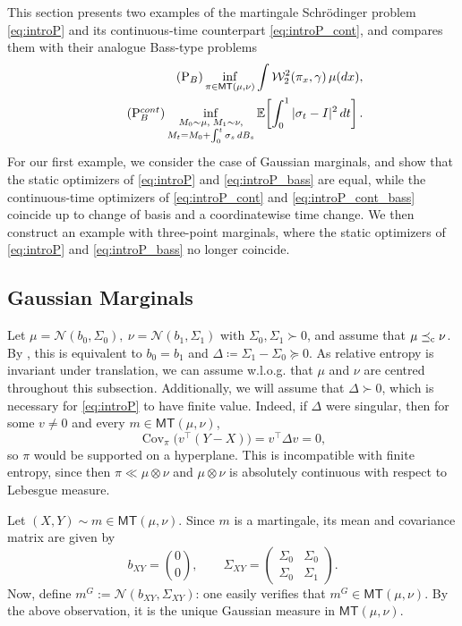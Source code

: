 \documentclass[reqno, a4paper]{amsart}
\theoremstyle{plain}
\theoremstyle{definition}
\theoremstyle{remark}
\numberwithin{equation}{section}
\numberwithin{theorem}{section}
\newcommand{\E}{\mathbb{E}}
\newcommand{\MT}{\mathsf{MT}}
\newcommand{\lc}{\preceq_{\textnormal{c}}}
\DeclareMathOperator{\Cov}{Cov}
\begin{document}
	This section presents two examples of the martingale Schr\"odinger problem
	\eqref{eq:introP} and its continuous-time counterpart \eqref{eq:introP_cont},
	and compares them with their analogue Bass-type problems
	\begin{align}
		\label{eq:introP_bass}\tag{P$_B$}
		\inf_{\pi\in \MT(\mu,\nu)}
		\int \mathcal W_2^2(\pi_x,\gamma)\,\mu(dx),\\
		\label{eq:introP_cont_bass}\tag{P$^{cont}_B$}
		\inf_{\substack{M_0\sim\mu,\;M_1\sim\nu,\\
				M_t=M_0+\int_0^t\sigma_s\,dB_s}}
		\E\!\left[\int_0^1|\sigma_t-I|^2\,dt\right].
	\end{align}
	For our first example, we consider the case of Gaussian marginals, and show that the static optimizers of \eqref{eq:introP} and
	\eqref{eq:introP_bass} are equal, while the continuous-time optimizers of
	\eqref{eq:introP_cont} and \eqref{eq:introP_cont_bass} coincide up to
	change of basis and a coordinatewise time change. We then construct an example with three-point marginals, where the static
	optimizers of \eqref{eq:introP} and \eqref{eq:introP_bass} no longer coincide.
	
	
	\subsection{Gaussian Marginals}
	Let
	$
	\mu=\mathcal N(b_0,\Sigma_0), \
	\nu=\mathcal N(b_1,\Sigma_1)
	$ with $\Sigma_0,\Sigma_1\succ0$,
	and assume that $\mu\lc\nu$.
	By \cite[Theorem~6]{Mu01},
	this is equivalent to $b_0=b_1$ and $
	\Delta\coloneq \Sigma_1-\Sigma_0\succeq0.$
	As relative entropy is invariant under translation, we can assume w.l.o.g. that $\mu$ and $\nu$ are centred throughout this subsection. Additionally, we will assume that $\Delta\succ0$, which is necessary for
	\eqref{eq:introP} to have finite value. Indeed, if $\Delta$ were singular,
	then for some $v\ne0$ and every $ m \in\MT(\mu,\nu)$,
	\[
	\Cov_\pi\bigl(v^\top(Y-X)\bigr)=v^\top\Delta v=0,
	\]
	so $\pi$ would be supported on a hyperplane. This is incompatible with
	finite entropy, since then $\pi\ll\mu\otimes\nu$ and $\mu\otimes\nu$ is
	absolutely continuous with respect to Lebesgue measure.
	
	Let $(X,Y)\sim m\in\MT(\mu,\nu)$. Since $m$ is a martingale, its mean and covariance matrix are given by
	\begin{equation*}\label{eq:mean_cov_XY}
		b_{XY}=\binom{0}{0},
		\qquad
		\Sigma_{XY}=
		\begin{pmatrix}
			\Sigma_0 & \Sigma_0\\
			\Sigma_0 & \Sigma_1
		\end{pmatrix}.
	\end{equation*}
	Now, define $m^G := \mathcal N(b_{XY},\Sigma_{XY})$: one easily verifies that $m^G\in\MT(\mu,\nu)$. By the above observation, it is the unique Gaussian measure in $\MT(\mu,\nu)$.
	
\end{document}
